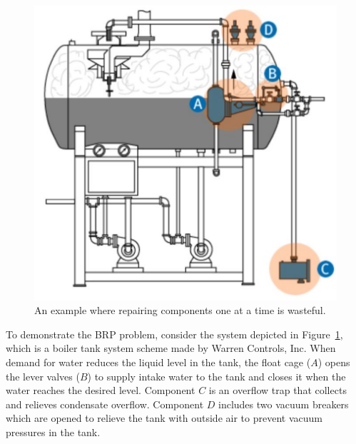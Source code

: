 \documentclass[a4paper,11pt]{report}
\newcommand\roni[1]{\textcolor{green}{roni: #1}}
\begin{document}




\begin{figure}{}%
\begin{center}
  \includegraphics[width=0.5\columnwidth]{system_example.pdf}
  \caption{An example where repairing components one at a time is wasteful.}
  \label{fig:simple-example}
\end{center}
\end{figure}

To demonstrate the BRP problem, consider the system depicted in Figure~\ref{fig:simple-example}, which is a boiler tank system scheme made by Warren Controls, Inc. When demand for water reduces the liquid level in the tank, the float cage ($A$) opens the lever valves ($B$) to supply intake water to the tank and closes it when the water reaches the desired level. Component $C$ is an overflow trap that collects and relieves condensate overflow. Component $D$ includes two vacuum breakers which are opened to relieve the tank with outside air to prevent vacuum pressures in the tank.
\end{document}
